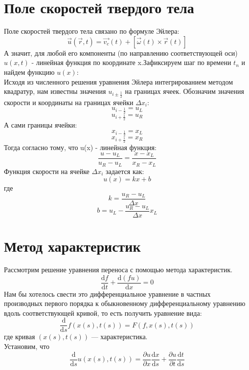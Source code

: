 \documentclass[10pt,a4paper]{article}
\begin{document}
\section{Поле скоростей твердого тела}
Поле скоростей твердого тела связано по формуле Эйлера:
\[
\overrightarrow{u}(\overrightarrow{r},t)=\overrightarrow{v_c}(t)+[\overrightarrow{\omega}(t)\times \overrightarrow{r}(t)]
\]
А значит, для любой его компоненты (по направлению соответствующей оси) $u(x,t)$ - линейная функция по координате x.Зафиксируем шаг по времени $t_n$ и найдем функцию $u(x)$:\\
Исходя из численного решения уравнения Эйлера интегрированием методом квадратур, нам известны значения $u_{i\pm\frac{1}{2}}$ на границах ячеек. Обозначим значения скорости и координаты на границах ячейки $\Delta x_i$:
\[ u_{i-\frac{1}{2}}=u_L \]
\[ u_{i+\frac{1}{2}}=u_R \]
А сами границы ячейки:
\[ x_{i-\frac{1}{2}}=x_L \]
\[ x_{i+\frac{1}{2}}=x_R \]
Тогда согласно тому, что u(x) - линейная функция:
\[
\frac{u-u_L}{u_R-u_L}=\frac{x-x_L}{x_R-x_L}
\]
Функция скорости на ячейке $\Delta x_i$ задается как:
\begin{equation}
u(x)=kx+b
\end{equation}
где
\[ k=\frac{u_R-u_L}{\Delta x} \]
\[ b=u_L-\frac{u_R-u_L}{\Delta x}x_L \]

\section{Метод характеристик}
Рассмотрим решение уравнения переноса с помощью метода характеристик.
\begin{equation}
\frac{\text{d}f}{\text{d}t} + \frac{\text{d}(f u)}{\text{d}x}=0
\end{equation}
Нам бы хотелось свести это дифференциальное уравнение в частных производных первого порядка к обыкновенному дифференциальному уравнению вдоль соответствующей кривой, то есть получить уравнение вида:
\[
\frac{\text{d}}{\text{d}s}f(x(s),t(s))=F(f,x(s),t(s))
\]
где кривая $(x(s),t(s))$ — характеристика.\\
Установим, что
\[
\frac{\text{d}}{\text{d}s}u(x(s),t(s))=\frac{\partial u}{\partial x}\frac{\text{d}x}{\text{d}s}+\frac{\partial u}{\partial t}\frac{\text{d}t}{\text{d}s}
\]
\end{document}
